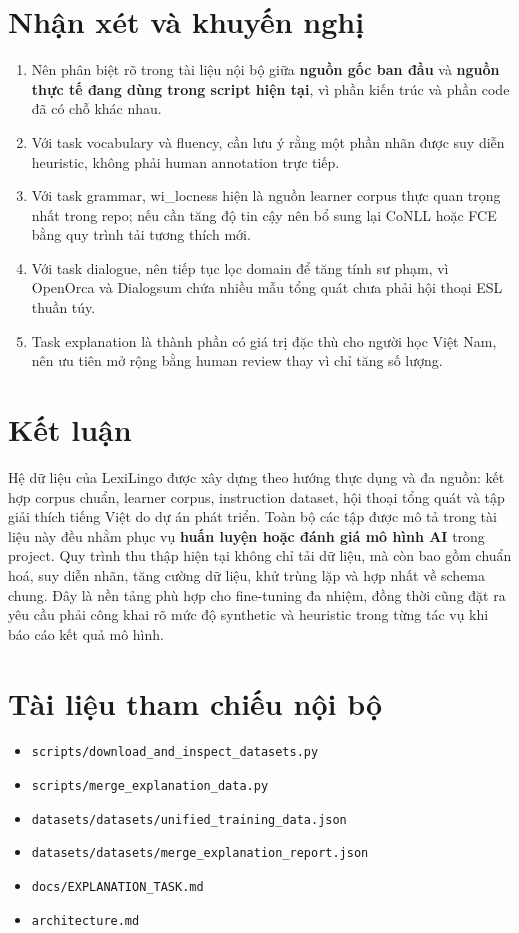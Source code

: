 \documentclass[12pt,a4paper]{article}
\begin{document}
\section{Nhận xét và khuyến nghị}

\begin{enumerate}[leftmargin=1.2cm]
    \item Nên phân biệt rõ trong tài liệu nội bộ giữa \textbf{nguồn gốc ban đầu} và \textbf{nguồn thực tế đang dùng trong script hiện tại}, vì phần kiến trúc và phần code đã có chỗ khác nhau.
    \item Với task vocabulary và fluency, cần lưu ý rằng một phần nhãn được suy diễn heuristic, không phải human annotation trực tiếp.
    \item Với task grammar, wi\_locness hiện là nguồn learner corpus thực quan trọng nhất trong repo; nếu cần tăng độ tin cậy nên bổ sung lại CoNLL hoặc FCE bằng quy trình tải tương thích mới.
    \item Với task dialogue, nên tiếp tục lọc domain để tăng tính sư phạm, vì OpenOrca và Dialogsum chứa nhiều mẫu tổng quát chưa phải hội thoại ESL thuần túy.
    \item Task explanation là thành phần có giá trị đặc thù cho người học Việt Nam, nên ưu tiên mở rộng bằng human review thay vì chỉ tăng số lượng.
\end{enumerate}

\section{Kết luận}

Hệ dữ liệu của LexiLingo được xây dựng theo hướng thực dụng và đa nguồn: kết hợp corpus chuẩn, learner corpus, instruction dataset, hội thoại tổng quát và tập giải thích tiếng Việt do dự án phát triển. Toàn bộ các tập được mô tả trong tài liệu này đều nhằm phục vụ \textbf{huấn luyện hoặc đánh giá mô hình AI} trong project. Quy trình thu thập hiện tại không chỉ tải dữ liệu, mà còn bao gồm chuẩn hoá, suy diễn nhãn, tăng cường dữ liệu, khử trùng lặp và hợp nhất về schema chung. Đây là nền tảng phù hợp cho fine-tuning đa nhiệm, đồng thời cũng đặt ra yêu cầu phải công khai rõ mức độ synthetic và heuristic trong từng tác vụ khi báo cáo kết quả mô hình.

\section*{Tài liệu tham chiếu nội bộ}

\begin{itemize}[leftmargin=1.2cm]
    \item \texttt{scripts/download\_and\_inspect\_datasets.py}
    \item \texttt{scripts/merge\_explanation\_data.py}
    \item \texttt{datasets/datasets/unified\_training\_data.json}
    \item \texttt{datasets/datasets/merge\_explanation\_report.json}
    \item \texttt{docs/EXPLANATION\_TASK.md}
    \item \texttt{architecture.md}
\end{itemize}
\end{document}

